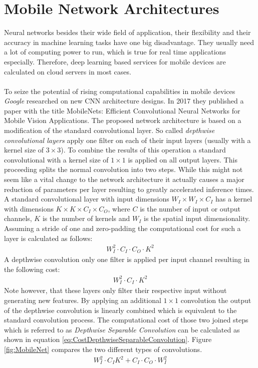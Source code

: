 \section{Mobile Network Architectures}
\label{sec:MobileNetworkArchitectures}
Neural networks besides their wide field of application, their flexibility and their accuracy in machine learning tasks have one big disadvantage. They usually need a lot of computing power to run, which is true for real time applications especially. Therefore, deep learning based services for mobile devices are calculated on cloud servers in most cases.\\
\\
To seize the potential of rising computational capabilities in mobile devices \textit{Google} researched on new CNN architecture designs. In 2017 they published a paper with the title \glqq MobileNets: Efficient Convolutional Neural Networks for Mobile Vision Applications\grqq\cite{mobilenet}. The proposed network architecture is based on a modification of the standard convolutional layer. So called \textit{depthwise convolutional layers} apply one filter on each of their input layers (usually with a kernel size of $3 \times 3$). To combine the results of this operation a standard convolutional with a kernel size of $1 \times 1$ is applied on all output layers. This proceeding splits the normal convolution into two steps. While this might not seem like a vital change to the network architecture it actually causes a major reduction of parameters per layer resulting to greatly accelerated inference times. A standard convolutional layer with input dimensions $W_I \times W_I \times C_I$ has a kernel with dimensions $K \times K \times C_I \times C_O$, where $C$ is the number of input or output channels, $K$ is the number of kernels and $W_I$ is the spatial input dimensionality. Assuming a stride of one and zero-padding the computational cost for such a layer is calculated as follows:
\begin{align}
W_I^2\cdot C_I \cdot C_O \cdot K^2
\end{align}
A depthwise convolution only one filter is applied per input channel resulting in the following cost:
\begin{align}
W_I^2\cdot C_I \cdot K^2
\end{align}
Note however, that these layers only filter their respective input without generating new features. By applying an additional $1 \times 1$ convolution the output of the depthwise convolution is linearly combined which is equivalent to the standard convolution process. The computational cost of those two joined steps which is referred to as \textit{Depthwise Separable Convolution} can be calculated as shown in equation \ref{eq:CostDepthwiseSeparableConvolution}. Figure \ref{fig:MobileNet} compares the two different types of convolutions.
\begin{align}
W_I^2 \cdot C_I K^2 + C_I \cdot C_O \cdot W_I^2
\label{eq:CostDepthwiseSeparableConvolution}
\end{align}

